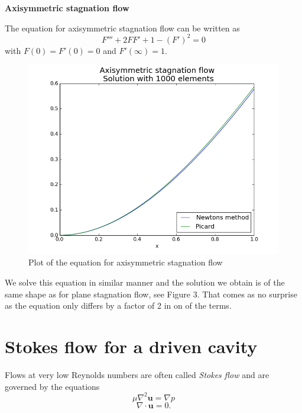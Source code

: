 \documentclass[11pt,a4paper,english]{article}
\numberwithin{equation}{section}
\begin{document}
\textbf{Axisymmetric stagnation flow}

The equation for axisymmetric stagnation flow can be written as
\begin{equation}
F''' + 2FF' + 1 - (F')^2 = 0
\end{equation}
with $F(0) = F'(0) = 0$ and $F'(\infty)=1$.

\begin{figure}[h!]
\begin{center}
  \includegraphics[scale=0.4]{axisym_stag.png}
  \end{center}
  \caption{Plot of the equation for axisymmetric stagnation flow}
  \label{fig:stokes_square}
\end{figure}

We solve this equation in similar manner and the solution we obtain is of the same shape as for plane stagnation flow, see Figure 3. That comes as no surprise as the equation only differs by a factor of 2 in on of the terms.   

\section{Stokes flow for a driven cavity}
Flows at very low Reynolds numbers are often called \emph{Stokes flow} and are governed by the equations 
\begin{equation}
\mu \nabla^2 \mathbf{u} = \nabla p
\end{equation}
\begin{equation}
\nabla \cdot \mathbf{u} = 0.
\end{equation}
\end{document}
